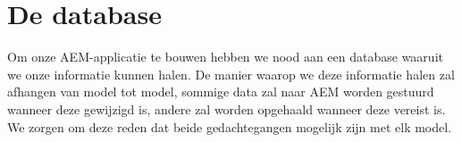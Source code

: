 \documentclass{article}
\begin{document}
	\section{De database}
	Om onze AEM-applicatie te bouwen hebben we nood aan een database waaruit we onze informatie kunnen halen.
	De manier waarop we deze informatie halen zal afhangen van model tot model, sommige data zal naar AEM worden gestuurd wanneer deze gewijzigd is, andere zal worden opgehaald wanneer deze vereist is. We zorgen om deze reden dat beide gedachtegangen mogelijk zijn met elk model.
\end{document}
